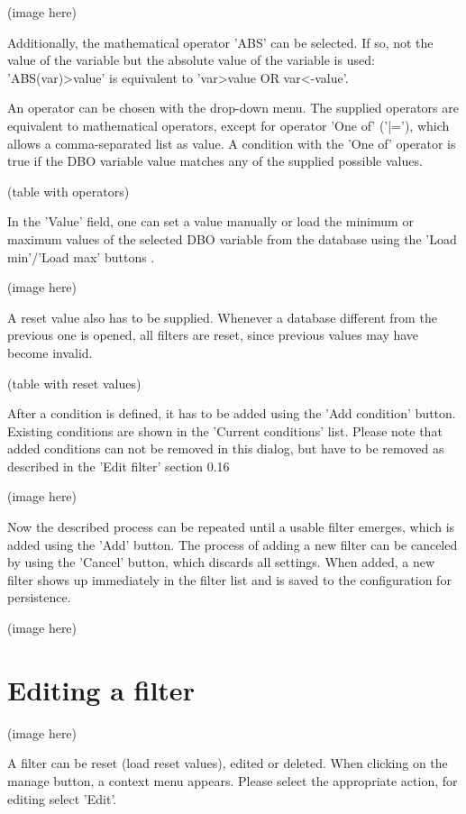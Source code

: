 \documentclass[10pt,letterpaper,extrafontsizes]{memoir}
\begin{document}
(image here)

Additionally, the mathematical operator 'ABS' can be selected. If so, not the value of the variable but the
absolute value of the variable is used: 'ABS(var)>value' is equivalent to 'var>value OR var<-value'.

An operator can be chosen with the drop-down menu.  The supplied operators are equivalent to mathematical operators, except for operator 'One of' ('|='), which allows a comma-separated list as value.  A condition with the 'One of' operator is true if the DBO variable value matches any of the supplied possible
values.

(table with operators)

In the 'Value' field, one can set a value manually or load the minimum or maximum values of the selected
DBO variable from the database using the 'Load min'/'Load max' buttons .

(image here)

A reset value also has to be supplied.  Whenever a database different from the previous one is opened,
all filters are reset, since previous values may have become invalid.

(table with reset values)

After a condition is defined, it has to be added using the 'Add condition' button. Existing conditions are
shown in the 'Current conditions' list. Please note that added conditions can not be removed in this dialog,
but have to be removed as described in the 'Edit filter' section 0.16

(image here)

Now the described process can be repeated until a usable filter emerges, which is added using the 'Add'
button. The process of adding a new filter can be canceled by using the 'Cancel' button, which discards all
settings. When added, a new filter shows up immediately in the filter list and is saved to the configuration
for persistence.

(image here)

\section{Editing a filter}
\label{sec:filter_editing}

(image here)

A filter can be reset (load reset values), edited or deleted.  When clicking on the manage button, a context menu appears. Please select the appropriate action, for editing select 'Edit'.
\end{document}
